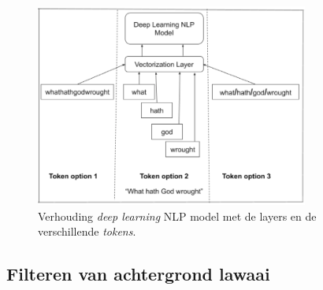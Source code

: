 \begin{figure}
    \centering
    \includegraphics[width=0.8\textwidth]{./img/tokenization-1.png}
    \caption{\label{fig:tokens_verhouding_dl}Verhouding \textit{deep learning} NLP model met de layers en de verschillende \textit{tokens}.~\autocite{Horan2020}}
\end{figure}

\clearpage

\subsection{Filteren van achtergrond lawaai}